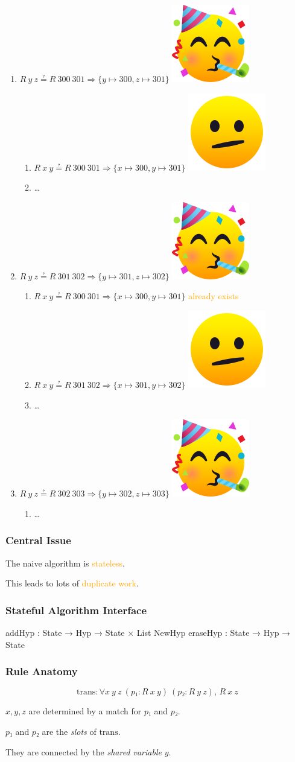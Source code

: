 \documentclass[xetex]{beamer}
\newlength{\emojiheight}
\newcommand{\good}{\includegraphics[height=\emojiheight]{images/1f973}}
\newcommand{\bad}{\includegraphics[height=\emojiheight]{images/1fae4}}
\newcommand{\orange}[1]{\textcolor{orange}{#1}}
\begin{document}
\begin{frame}
  \begin{enumerate}[<+->]
    \item $R~y~z ≟ R~300~301 ⇒ \{y ↦ 300, z ↦ 301\}$ \good
          \begin{enumerate}[<+->]
            \item $R~x~y ≟ R~300~301 ⇒ \{x ↦ 300, y ↦ 301\}$ \bad
            \item \dots
          \end{enumerate}
    \item $R~y~z ≟ R~301~302 ⇒ \{y ↦ 301, z ↦ 302\}$ \good
          \begin{enumerate}[<+->]
            \item $R~x~y ≟ R~300~301 ⇒ \{x ↦ 300, y ↦ 301\}$ \orange{already exists}
            \item $R~x~y ≟ R~301~302 ⇒ \{x ↦ 301, y ↦ 302\}$ \bad
            \item \dots
          \end{enumerate}
    \item $R~y~z ≟ R~302~303 ⇒ \{y ↦ 302, z ↦ 303\}$ \good
          \begin{enumerate}
            \item \dots
          \end{enumerate}
  \end{enumerate}
\end{frame}

\begin{frame}
  \frametitle{Central Issue}

  The naive algorithm is \orange{stateless}.

  This leads to lots of \orange{duplicate work}.
\end{frame}

\begin{frame}[fragile]
  \frametitle{Stateful Algorithm Interface}

  \begin{leancode}
    addHyp   : State → Hyp → State × List NewHyp
    eraseHyp : State → Hyp → State
  \end{leancode}
\end{frame}

\begin{frame}
  \frametitle{Rule Anatomy}

  \[
    \mathrm{trans} : ∀ x~y~z~(p₁ : R~x~y)~(p₂ : R~y~z),\, R~x~z
  \]

  $x, y, z$ are determined by a match for $p₁$ and $p₂$.

  $p₁$ and $p₂$ are the \emph{slots} of $\mathrm{trans}$.

  They are connected by the \emph{shared variable} $y$.
\end{frame}
\end{document}
